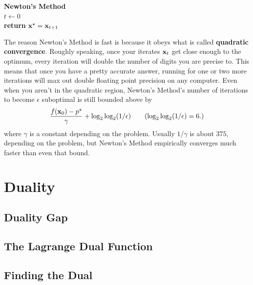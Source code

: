 \documentclass{article}
\begin{document}
\IncMargin{1em}
\begin{algorithm}
    \textbf{Newton's Method}\\
    $t \leftarrow 0$\\
    \textbf{return } ${\bf x}^\star = {\bf x}_{t+1}$
\end{algorithm}

The reason Newton's Method is fast is because it obeys what is called \textbf{quadratic
convergence}. Roughly speaking, once your iterates ${\bf x}_t$ get close enough to the optimum,
every iteration will double the number of digits you are precise to. This means that once
you have a pretty accurate answer, running for one or two more iterations will max out
double floating point precision on any computer. Even when you aren't in the quadratic region,
Newton's Method's number of iterations to become $\epsilon$ suboptimal is still bounded above
by
\[
    \frac{f({\bf x}_0)-p^\star}{\gamma} + \log_2\log_2(1/\epsilon) \tag{$\log_2\log_2(1/\epsilon)=6.$}
\]
where $\gamma$ is a constant depending on the problem. Usually $1/\gamma$ is about $375$,
depending on the problem, but Newton's Method empirically converges much faster than even
that bound.

\section{Duality}

\subsection{Duality Gap}

\subsection{The Lagrange Dual Function}

\subsection{Finding the Dual}
\end{document}
